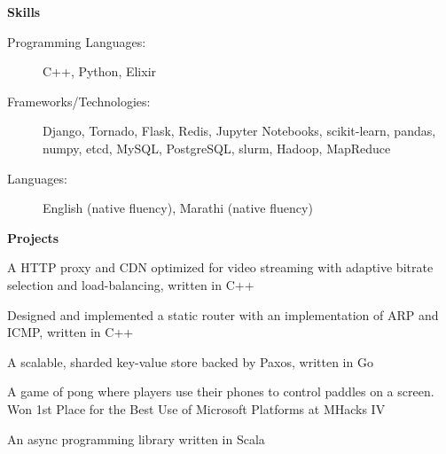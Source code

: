 \documentclass[letterpaper,11pt]{article}
\newcommand{\resheading}[1]{{\large \colorbox{mygrey}{\begin{minipage}{\textwidth}{\textbf{#1 \vphantom{p\^{E}}}}\end{minipage}}}}
\renewcommand{\footnotesize}{\fontsize{10pt}{11pt}\selectfont}
\begin{document}
		\resheading{Skills}
		\begin{description}
			\item[Programming Languages:]
			{	
				\footnotesize
				C++, Python, Elixir
			}
			\item[Frameworks/Technologies:]
			{
				\footnotesize
				Django, Tornado, Flask, Redis, Jupyter Notebooks, scikit-learn, pandas, numpy, etcd, MySQL, PostgreSQL, slurm, Hadoop, MapReduce
			}
			\item[Languages:]
			{
				\footnotesize
				English (native fluency), Marathi (native fluency)
			}
		\end{description} %
				
		\resheading{Projects}
		\begin{description}
			\item[VideoCDN:]
			{
				\footnotesize
				A HTTP proxy and CDN optimized for video streaming with adaptive bitrate selection and load-balancing, written in C++
			}
			\item[StaticRouter:]
			{
				\footnotesize
				Designed and implemented a static router with an implementation of ARP and ICMP, written in C++
			\item[ShardKV:]
			{
				\footnotesize
				A scalable, sharded key-value store backed by Paxos, written in Go
			}

			}
			\item[PongWithMe:]
			{
				\footnotesize
				A game of pong where players use their phones to control paddles on a screen. Won 1st Place for the Best Use of Microsoft Platforms at MHacks IV
			}
							
			\item[Spar:]
			{
				\footnotesize
				An async programming library written in Scala
			}				
		\end{description}
						
						
\end{document}
